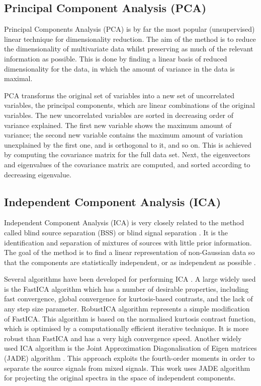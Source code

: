 \documentclass[a4paper,fleqn,usenatbib]{mnras}
\begin{document}
\subsection{Principal Component Analysis (PCA)}

Principal Components Analysis (PCA) \citep{hotelling:33,pearson:01} is
by far the most popular (unsupervised) linear technique for
dimensionality reduction. The aim of the method is to reduce the
dimensionality of multivariate data whilst preserving as much of the
relevant information as possible. This is done by finding a linear
basis of reduced dimensionality for the data, in which the amount of
variance in the data is maximal.

PCA transforms the original set of variables into a new set of
uncorrelated variables, the principal components, which are linear
combinations of the original variables. The new uncorrelated variables
are sorted in decreasing order of variance explained. The first
new variable shows the maximum amount of variance; the second
new variable contains the maximum amount of variation unexplained by
the first one, and is orthogonal to it, and so on.  This is
achieved by computing the covariance matrix for the full data
set. Next, the eigenvectors and eigenvalues of the covariance matrix
are computed, and sorted according to decreasing eigenvalue.

\subsection{Independent Component Analysis (ICA)}

Independent Component Analysis (ICA) \citep{comon:94} is very closely
related to the method called blind source separation (BSS) or blind
signal separation \citep{jutten:91}. It is the identification and
separation of mixtures of sources with little prior information. The
goal of the method is to find a linear representation of non-Gaussian
data so that the components are statistically independent, or as
independent as possible \citep{hyvarinen:00}.

Several algorithms have been developed for performing ICA
\citep{bell:95,belouchrani:97,ollila:06,li:08}. A large widely used is
the FastICA algorithm \citep{hyvarinen:00} which has a number of
desirable properties, including fast convergence, global convergence
for kurtosis-based contrasts, and the lack of any step size parameter.
RobustICA algorithm \citep{zarzoso:10} represents a simple modification
of FastICA. This algorithm is based on the normalised kurtosis
contrast function, which is optimised by a computationally efficient
iterative technique. It is more robust than FastICA and has a very
high convergence speed.  Another widely used ICA algorithm is the
Joint Approximation Diagonalisation of Eigen matrices (JADE) algorithm
\citep{cardoso:93}. This approach exploits the fourth-order moments in
order to separate the source signals from mixed signals. This work
uses JADE algorithm for projecting the original spectra in the space
of independent components.
\end{document}
